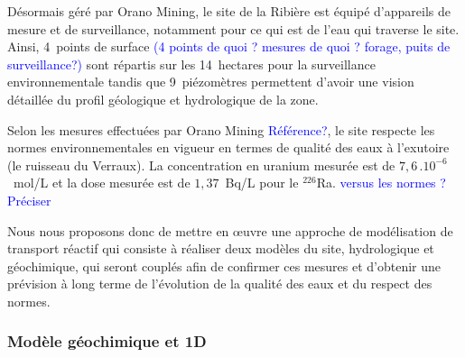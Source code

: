 \documentclass{article}
\newcommand{\blue}[1]{\textcolor{blue}{#1}} %
\begin{document}
Désormais géré par Orano Mining, le site de la Ribière est équipé d'appareils de mesure et de surveillance, notamment pour ce qui est de l’eau qui traverse le site. Ainsi, 4~points de surface \blue{(4 points de quoi ? mesures de quoi ? forage, puits de surveillance?)} sont répartis sur les 14~hectares pour la surveillance environnementale tandis que 9~piézomètres permettent d’avoir une vision détaillée du profil géologique et hydrologique de la zone.

Selon les mesures effectuées par Orano Mining \blue{Référence?}, le site respecte les normes environnementales en vigueur en termes de qualité des eaux à l’exutoire (le ruisseau du Verraux). La concentration en uranium mesurée est de $7,6 \, . 10^{-6}$~mol/L et la dose mesurée est de $1,37$~Bq/L pour le $^{226}$Ra. \blue{versus les normes ? Préciser}

Nous nous proposons donc de mettre en œuvre une approche de modélisation de transport réactif qui consiste à réaliser deux modèles du site, hydrologique et géochimique, qui seront couplés afin de confirmer ces mesures et d’obtenir une prévision à long terme de l'évolution de la qualité des eaux et du respect des normes. 

\subsubsection{Modèle géochimique et 1D} \label{subsec:geoch_1D}
\end{document}
